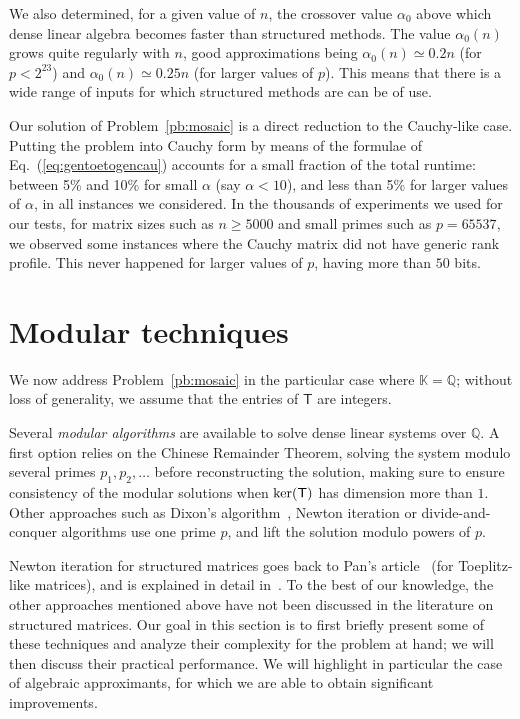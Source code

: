 \documentclass{sig-alternate}
\newcommand{\mT}{\ensuremath{\mathsf{T}}}
\newcommand{\K}{\ensuremath{\mathbb{K}}}
\newcommand{\Q}{\ensuremath{\mathbb{Q}}}
\begin{document}
We also determined, for a given value of $n$, the crossover value
$\alpha_0$ above which dense linear algebra becomes faster than
structured methods.  The value $\alpha_0(n)$ grows quite regularly
with $n$, good approximations being $\alpha_0(n) \simeq 0.2 n$ (for $p
< 2^{23}$) and $\alpha_0(n) \simeq 0.25 n$ (for larger values of
$p$). This means that there is a wide range of inputs for which
structured methods are can be of use.

Our solution of Problem~\ref{pb:mosaic} is a direct reduction to the
Cauchy-like case. Putting the problem into Cauchy form by means of the
formulae of Eq.~(\ref{eq:gentoetogencau}) accounts for a small
fraction of the total runtime: between 5\% and 10\% for small $\alpha$
(say $\alpha < 10$), and less than 5\% for larger values of $\alpha$,
in all instances we considered.  In the thousands of experiments we used
for our tests, for matrix sizes such as $n \ge 5000$ and small primes
such as $p=65537$, we observed some instances where the Cauchy matrix
did not have generic rank profile. This never happened for larger 
values of $p$, having more than $50$ bits.


\section{Modular techniques}\label{sec:lifting}

We now address Problem~\ref{pb:mosaic} in the particular case where
$\K=\Q$; without loss of generality, we assume that the entries of
$\mT$ are integers. 

Several {\em modular algorithms} are available to solve dense linear
systems over $\Q$. A first option relies on the Chinese Remainder
Theorem, solving the system modulo several primes $p_1,p_2,\dots$
before reconstructing the solution, making sure to ensure consistency
of the modular solutions when ${\rm ker}(\mT)$ has dimension more than
$1$. Other approaches such as Dixon's algorithm~\cite{Dixon82}, Newton
iteration or divide-and-conquer algorithms use one prime $p$, and lift
the solution modulo powers of $p$.

Newton iteration for structured matrices goes back to Pan's
article~\cite{Pan92} (for Toeplitz-like matrices), and is explained in
detail in~\cite[Chapter~7]{Pan01}. To the best of our knowledge, the
other approaches mentioned above have not been discussed in the
literature on structured matrices. Our goal in this section is to
first briefly present some of these techniques and analyze their
complexity for the problem at hand; we will then discuss their
practical performance. We will highlight in particular the case of
algebraic approximants, for which we are able to obtain significant
improvements.
\end{document}
